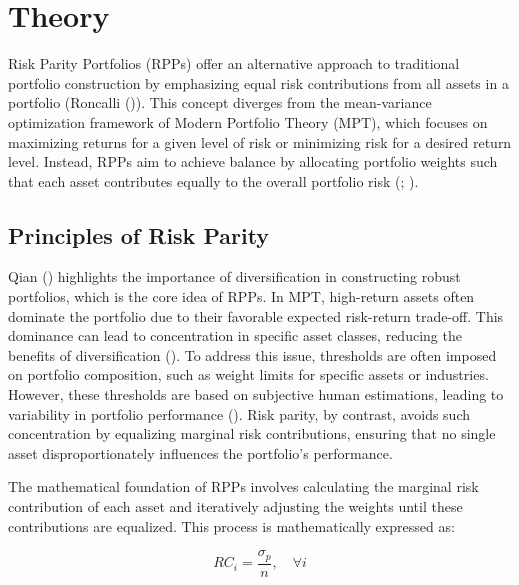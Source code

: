 \documentclass[11pt,preprint]{elsarticle}
\numberwithin{equation}{section}
\numberwithin{figure}{section}
\numberwithin{table}{section}
\begin{document}
\section{Theory}\label{theory}

Risk Parity Portfolios (RPPs) offer an alternative approach to
traditional portfolio construction by emphasizing equal risk
contributions from all assets in a portfolio (Roncalli
()). This concept diverges
from the mean-variance optimization framework of Modern Portfolio Theory
(MPT), which focuses on maximizing returns for a given level of risk or
minimizing risk for a desired return level. Instead, RPPs aim to achieve
balance by allocating portfolio weights such that each asset contributes
equally to the overall portfolio risk
(;
).

\subsection{Principles of Risk Parity}\label{principles-of-risk-parity}

Qian () highlights the importance of
diversification in constructing robust portfolios, which is the core
idea of RPPs. In MPT, high-return assets often dominate the portfolio
due to their favorable expected risk-return trade-off. This dominance
can lead to concentration in specific asset classes, reducing the
benefits of diversification ().
To address this issue, thresholds are often imposed on portfolio
composition, such as weight limits for specific assets or industries.
However, these thresholds are based on subjective human estimations,
leading to variability in portfolio performance
().
Risk parity, by contrast, avoids such concentration by equalizing
marginal risk contributions, ensuring that no single asset
disproportionately influences the portfolio's performance.

The mathematical foundation of RPPs involves calculating the marginal
risk contribution of each asset and iteratively adjusting the weights
until these contributions are equalized. This process is mathematically
expressed as:

\begin{equation}
RC_i = \frac{\sigma_p}{n}, \quad \forall i
\end{equation}
\end{document}
